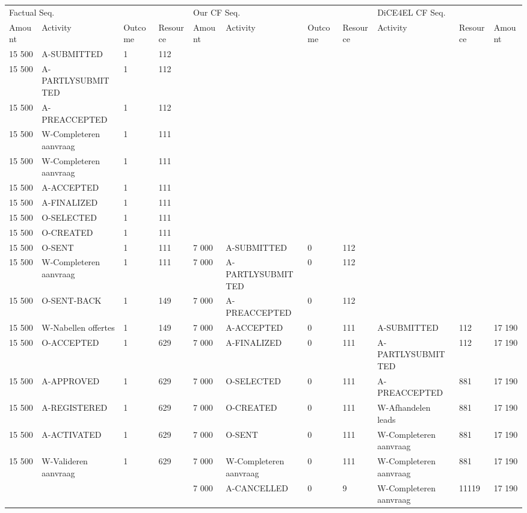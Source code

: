 \begin{tabular}{lllllllllll}
\toprule
\multicolumn{4}{l}{Factual Seq.} & \multicolumn{4}{l}{Our CF Seq.} & \multicolumn{3}{l}{DiCE4EL CF Seq.} \\
Amount & Activity & Outcome & Resource & Amount & Activity & Outcome & Resource & Activity & Resource & Amount \\
\midrule
15 500 & A-SUBMITTED & 1 & 112 &  &  &  &  &  &  &  \\
15 500 & A-PARTLYSUBMITTED & 1 & 112 &  &  &  &  &  &  &  \\
15 500 & A-PREACCEPTED & 1 & 112 &  &  &  &  &  &  &  \\
15 500 & W-Completeren aanvraag & 1 & 111 &  &  &  &  &  &  &  \\
15 500 & W-Completeren aanvraag & 1 & 111 &  &  &  &  &  &  &  \\
15 500 & A-ACCEPTED & 1 & 111 &  &  &  &  &  &  &  \\
15 500 & A-FINALIZED & 1 & 111 &  &  &  &  &  &  &  \\
15 500 & O-SELECTED & 1 & 111 &  &  &  &  &  &  &  \\
15 500 & O-CREATED & 1 & 111 &  &  &  &  &  &  &  \\
15 500 & O-SENT & 1 & 111 & 7 000 & A-SUBMITTED & 0 & 112 &  &  &  \\
15 500 & W-Completeren aanvraag & 1 & 111 & 7 000 & A-PARTLYSUBMITTED & 0 & 112 &  &  &  \\
15 500 & O-SENT-BACK & 1 & 149 & 7 000 & A-PREACCEPTED & 0 & 112 &  &  &  \\
15 500 & W-Nabellen offertes & 1 & 149 & 7 000 & A-ACCEPTED & 0 & 111 & A-SUBMITTED & 112 & 17 190 \\
15 500 & O-ACCEPTED & 1 & 629 & 7 000 & A-FINALIZED & 0 & 111 & A-PARTLYSUBMITTED & 112 & 17 190 \\
15 500 & A-APPROVED & 1 & 629 & 7 000 & O-SELECTED & 0 & 111 & A-PREACCEPTED & 881 & 17 190 \\
15 500 & A-REGISTERED & 1 & 629 & 7 000 & O-CREATED & 0 & 111 & W-Afhandelen leads & 881 & 17 190 \\
15 500 & A-ACTIVATED & 1 & 629 & 7 000 & O-SENT & 0 & 111 & W-Completeren aanvraag & 881 & 17 190 \\
15 500 & W-Valideren aanvraag & 1 & 629 & 7 000 & W-Completeren aanvraag & 0 & 111 & W-Completeren aanvraag & 881 & 17 190 \\
 &  &  &  & 7 000 & A-CANCELLED & 0 & 9 & W-Completeren aanvraag & 11119 & 17 190 \\
\bottomrule
\end{tabular}
